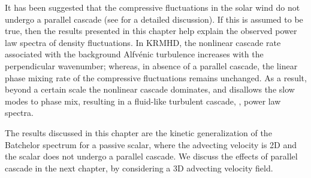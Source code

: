     It has been suggested that the compressive fluctuations in the solar wind do not
    undergo a parallel cascade \cite{tome} (see  for a
    detailed discussion). If this is assumed to be true, then the results presented in
    this chapter help explain the observed power law spectra of density fluctuations. In
    KRMHD, the nonlinear cascade rate associated with the background Alfv\'{e}nic
    turbulence increases with the perpendicular wavenumber; whereas, in absence of a
    parallel cascade, the linear
    phase mixing rate of the compressive fluctuations remains unchanged. As a result, beyond a certain scale the nonlinear
    cascade dominates, and disallows the slow modes to phase mix, resulting in a
    fluid-like turbulent cascade, \ie, power law spectra.
    
    The results discussed in this chapter are the kinetic generalization of the Batchelor spectrum for a 
    passive scalar, where the advecting velocity is 2D and the scalar does not undergo a
    parallel cascade. We discuss the effects of parallel cascade in the next chapter, by
    considering a 3D advecting velocity field.
    
